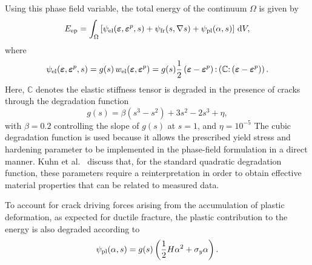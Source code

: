 \documentclass[pdflatex,sn-mathphys-num]{sn-jnl}%
\theoremstyle{thmstyleone}%
\theoremstyle{thmstyletwo}%
\theoremstyle{thmstylethree}%
\begin{document}
Using this phase field variable, the total energy of the continuum $\Omega$ is given by
\begin{equation}
    E_{\rm{ep}} = \int_{\Omega} \left[ 
    \psi_{\rm{el}}(\boldsymbol{\varepsilon},\boldsymbol{\varepsilon}^p,s) 
    + \psi_{\rm{fr}}(s,\nabla{s}) 
    + \psi_{\rm{pl}}(\alpha,s)
    \right] \, \mathrm{d}V,
    \label{eq:E_ep_total}
\end{equation}
where
\begin{equation}
    \psi_{\rm{el}}(\boldsymbol{\varepsilon},\boldsymbol{\varepsilon}^p,s)
    = g(s)\,w_{\rm{el}}(\boldsymbol{\varepsilon},\boldsymbol{\varepsilon}^p)
    = g(s)\dfrac{1}{2}
    \left(\boldsymbol{\varepsilon}-\boldsymbol{\varepsilon}^p\right)
    {:}
    \left(\boldsymbol{\mathbb{C}}{:}
    \left(\boldsymbol{\varepsilon}-\boldsymbol{\varepsilon}^p\right)\right).
    \label{eq:psi_el}
\end{equation}
Here, $\boldsymbol{\mathbb{C}}$ denotes the elastic stiffness tensor is degraded in the presence of cracks through the degradation function
\begin{equation}
    g(s) = \beta\left(s^3 - s^2\right) + 3s^2 - 2s^3 + \eta,
    \label{eq:deg_grad}
\end{equation}
with $\beta = 0.2$ controlling the slope of $g(s)$ at $s=1$, and $\eta = 10^{-5}$ 
The cubic degradation function is used because it allows the prescribed yield stress and hardening parameter to be implemented in the phase-field formulation in a direct manner.
Kuhn et al.~\cite{kuhn_phase_2016} discuss that, for the standard quadratic degradation function, these parameters require a reinterpretation in order to obtain effective material properties that can be related to measured data.

To account for crack driving forces arising from the accumulation of plastic deformation, as expected for ductile fracture, the plastic contribution to the energy is also degraded according to
\begin{equation}
    \psi_{\rm{pl}}(\alpha,s) = g(s)\left(\dfrac{1}{2}H\alpha^2 + \sigma_y\alpha\right).
    \label{eq:psi_pl}
\end{equation}
\end{document}
